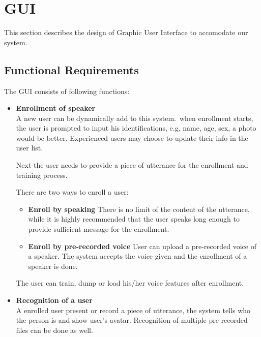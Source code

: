 \section{GUI}
	This section describes the design of Graphic User Interface to accomodate our system.
\subsection{Functional Requirements}
	The GUI consists of following functions:
	\begin{itemize}
		\item \textbf{Enrollment of speaker} \\
			A new user can be dynamically add to this system.\
			when enrollment starts, the user is prompted to input
			his identifications, e.g, name, age, sex, a photo would
			be better. Experienced users may choose to update their 
			info in the user list. 

			Next the user needs to provide a piece of utterance for 
			the enrollment and training process. 
			 
			There are two ways to enroll a user:
			\begin{itemize}
				\item \textbf{Enroll by speaking}
					There is no limit of the content of the utterance, while
					it is highly recommended that the user speaks long enough
					to provide sufficient message for the enrollment.

				\item \textbf{Enroll by pre-recorded voice}
					User can upload a pre-recorded voice of a speaker. The system
					accepts the voice given and the enrollment of a speaker is done.
			\end{itemize}

			The user can train, dump or load his/her voice features after enrollment.

		\item \textbf{Recognition of a user} \\
			A enrolled user present or record a piece of utterance,
			the system tells who the person is and show user's avatar.
			Recognition of multiple pre-recorded files can be done as well. 


\end{itemize}
